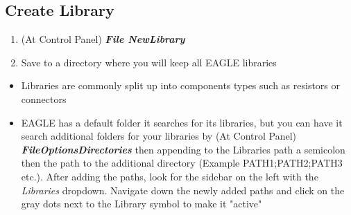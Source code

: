 \documentclass{article}
\begin{document}
\subsection{Create Library} \label{create library}
\begin{enumerate}
    \item (At Control Panel) \textit{\textbf{File\textrightarrow
    New\textrightarrow Library}}
    \item Save to a directory where you will keep all EAGLE libraries
\end{enumerate}
\begin{tcolorbox} [title=Tips \& Tricks]
    \begin{itemize}
        \item Libraries are commonly split up into components types such as resistors or connectors
        \item EAGLE has a default folder it searches for its libraries, but you can have it search additional folders for your libraries by (At Control Panel) \textit{\textbf{File\textrightarrow Options\textrightarrow Directories}} then appending to the Libraries path a semicolon then the path to the additional directory (Example PATH1;PATH2;PATH3 etc.). After adding the paths, look for the sidebar on the left with the \textit{Libraries} dropdown. Navigate down the newly added paths and click on the gray dots next to the Library symbol to make it "active"
    \end{itemize}
\end{tcolorbox}
\end{document}
